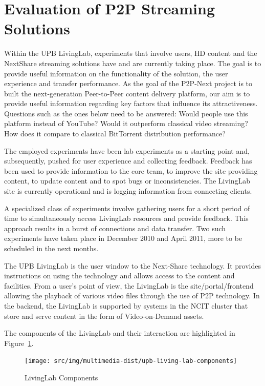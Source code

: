 \section{Evaluation of P2P Streaming Solutions}
\label{sec:multimedia-dist:evaluation}

Within the UPB LivingLab, experiments that involve users, HD content and the
NextShare streaming solutions have and are currently taking place. The goal is
to provide useful information on the functionality of the solution, the user
experience and transfer performance. As the goal of the P2P-Next project
is to built the next-generation Peer-to-Peer content delivery platform, our
aim is to provide useful information regarding key factors that influence its
attractiveness. Questions such as the ones below need to be answered: Would people use this platform instead of
YouTube? Would it outperform classical video streaming? How does it compare to
classical BitTorrent distribution performance?

The employed experiments have been lab experiments as a starting point and,
subsequently, pushed for user experience and collecting feedback. Feedback has
been used to provide information to the core team, to improve the site
providing content, to update content and to spot bugs or inconsistencies.
The LivingLab site is currently operational and is logging information from
connecting clients.

A specialized class of experiments involve gathering users for a short
period of time to simultaneously access LivingLab resources and provide
feedback. This approach results in a burst of connections and data transfer. Two such
experiments have taken place in December 2010 and April 2011, more to be
scheduled in the next months.

The UPB LivingLab is the user window to the Next-Share technology. It
provides instructions on using the technology and allows access to the content
and facilities. From a user's point of view,
the LivingLab is the site/portal/frontend allowing the playback of various video
files through the use of P2P technology. In the backend, the LivingLab is
supported by systems in the NCIT cluster that store and serve content in the
form of Video-on-Demand assets.

The components of the LivingLab and their interaction are highlighted in
Figure~\ref{fig:multimedia-dist:upb-living-lab-components}.

\begin{figure}
  \centering
  \texttt{[image: src/img/multimedia-dist/upb-living-lab-components]}
  \caption{LivingLab Components}
  \label{fig:multimedia-dist:upb-living-lab-components}
\end{figure}

